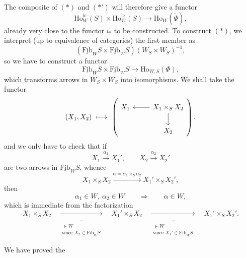 \documentclass[11pt]{article}
\newcommand{\printedpage}[1]{\marginpar{\footnotesize p.~#1}}
\newcommand{\msp}[1]{\marginpar{\footnotesize [#1]}}
\newcommand{\Fibu}{\underline{\mathrm{Fib}}}
\newcommand{\Ho}{\mathrm{Ho}}
\newcommand{\lc}{\mathrm{lc}}
\begin{document}
\msp{page 245}
The composite of $(*)$ and $(*')$ will therefore give a functor
\[
\Ho^{\lc}_W(S) \times \Ho^{\lc}_W(S) \longrightarrow \Ho_W(\tilde{\Psi}), \tag*{$(**)$}
\]
already very close to the functor $i_*$ to be constructed. To construct $(*)$, we interpret (up to equivalence of categories) the first member as
\[
(\Fibu_W S \times \Fibu_W S)(W_S \times W_S)^{-1},
\]
so we have to construct a functor
\[
\Fibu_W S \times \Fibu_W S \longrightarrow \Ho_{W,S}(\Phi),
\]
which transforms arrows in $W_S \times W_S$ into isomorphisms. We shall take the functor
\[
(X_1, X_2) \ \longmapsto \
\left(
\begin{tikzcd}[ampersand replacement=\&]
X_1 \& X_1 \times_S X_2 \arrow[l] \arrow[d] \\
 \& X_2
\end{tikzcd}
\right),
\]
\printedpage{159}
and we only have to check that if
\[
X_1 \xrightarrow{\alpha_1} X_1', \qquad X_2 \xrightarrow{\alpha_2} X_2'
\]
are two arrows in $\Fibu_W S$, whence
\[
X_1 \times_S X_2 \xrightarrow{\alpha = \alpha_1 \times_S \alpha_2} X_1' \times_S X_2',
\]
then
\[
\alpha_1 \in W,\ \alpha_2 \in W \qquad \Longrightarrow \qquad \alpha \in W,
\]
which is immediate from the factorization
\[
X_1 \times_S X_2 \quad \underbrace{\longrightarrow}_{\substack{\in W \\ \text{since } X_2 \in \Fibu_W S}} \quad X_1' \times_S X_2 \quad \underbrace{\longrightarrow}_{\substack{\in W \\ \text{since } X_1' \in \Fibu_W S}} \quad X_1' \times_S X_2'.
\]

\msp{page 246}
We have proved the
\end{document}
